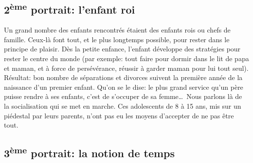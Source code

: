 \documentclass[11pt]{article} %
\begin{document}
\subsection{2\textsuperscript{ème} portrait: l'enfant roi }

  Un grand nombre des enfants rencontrés étaient des enfants rois ou chefs de famille. Ceux-là font tout, et le plus longtemps possible, pour rester dans le principe de plaisir.\newline
  Dès la petite enfance, l'enfant développe des stratégies pour rester le centre du monde (par exemple: tout faire pour dormir dans le lit de papa et maman, et à force de persévérance, réussir à garder maman pour lui tout seul). Résultat: bon nombre de séparations et divorces suivent la première année de la naissance d'un premier enfant. Qu'on se le dise: le plus grand service qu'un père puisse rendre à ses enfants, c'est de s'occuper de sa femme\dots\ Nous parlons là de la socialisation qui se met en marche.\newline
  Ces adolescents de 8 à 15 ans, mis sur un piédestal par leurs parents, n'ont pas eu les moyens d'accepter de ne pas être tout.

\subsection{3\textsuperscript{ème} portrait: la notion de temps }
\end{document}

